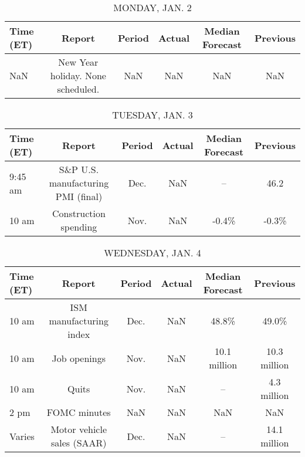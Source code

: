 \documentclass{article}%
\begin{document}
%
\normalsize%


\begin{table}[htbp]%
\caption{MONDAY, JAN. 2}%
\centering%
\begin{adjustbox}{width=1\textwidth}%
\begin{tabular}{lccccc}
\toprule
Time (ET) &                            Report & Period & Actual & Median Forecast & Previous \\
\midrule
      NaN & New Year holiday. None scheduled. &    NaN &    NaN &             NaN &      NaN \\
\bottomrule
\end{tabular}
%
\end{adjustbox}%
\end{table}

%


\begin{table}[htbp]%
\caption{TUESDAY, JAN. 3}%
\centering%
\begin{adjustbox}{width=1\textwidth}%
\begin{tabular}{lccccc}
\toprule
Time (ET) &                             Report & Period & Actual & Median Forecast & Previous \\
\midrule
  9:45 am & S\&P U.S. manufacturing PMI (final) &   Dec. &    NaN &              -- &     46.2 \\
    10 am &              Construction spending &   Nov. &    NaN &           -0.4\% &    -0.3\% \\
\bottomrule
\end{tabular}
%
\end{adjustbox}%
\end{table}

%


\begin{table}[htbp]%
\caption{WEDNESDAY, JAN. 4}%
\centering%
\begin{adjustbox}{width=1\textwidth}%
\begin{tabular}{lccccc}
\toprule
Time (ET) &                     Report & Period & Actual & Median Forecast &     Previous \\
\midrule
    10 am &    ISM manufacturing index &   Dec. &    NaN &           48.8\% &        49.0\% \\
    10 am &               Job openings &   Nov. &    NaN &    10.1 million & 10.3 million \\
    10 am &                      Quits &   Nov. &    NaN &              -- &  4.3 million \\
     2 pm &               FOMC minutes &    NaN &    NaN &             NaN &          NaN \\
   Varies & Motor vehicle sales (SAAR) &   Dec. &    NaN &              -- & 14.1 million \\
\bottomrule
\end{tabular}
%
\end{adjustbox}%
\end{table}
\end{document}
